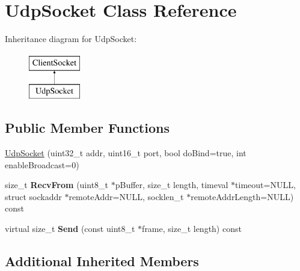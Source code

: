 \hypertarget{class_udp_socket}{\section{Udp\-Socket Class Reference}
\label{class_udp_socket}
}
Inheritance diagram for Udp\-Socket\-:\begin{figure}[H]
\begin{center}
\leavevmode
\includegraphics[height=2.000000cm]{class_udp_socket}
\end{center}
\end{figure}
\subsection*{Public Member Functions}
\begin{DoxyCompactItemize}
\item 
\hyperlink{class_udp_socket_a017a02140e8618ce88f8d8c5a3bf2ba3}{Udp\-Socket} (uint32\-\_\-t addr, uint16\-\_\-t port, bool do\-Bind=true, int enable\-Broadcast=0)
\item 
\hypertarget{class_udp_socket_a1391f69e42186e42966deb59c45f381f}{size\-\_\-t {\bfseries Recv\-From} (uint8\-\_\-t $\ast$p\-Buffer, size\-\_\-t length, timeval $\ast$timeout=N\-U\-L\-L, struct sockaddr $\ast$remote\-Addr=N\-U\-L\-L, socklen\-\_\-t $\ast$remote\-Addr\-Length=N\-U\-L\-L) const }\label{class_udp_socket_a1391f69e42186e42966deb59c45f381f}

\item 
\hypertarget{class_udp_socket_a434383e163f13643cff11a2cdf59961a}{virtual size\-\_\-t {\bfseries Send} (const uint8\-\_\-t $\ast$frame, size\-\_\-t length) const }\label{class_udp_socket_a434383e163f13643cff11a2cdf59961a}

\end{DoxyCompactItemize}
\subsection*{Additional Inherited Members}


